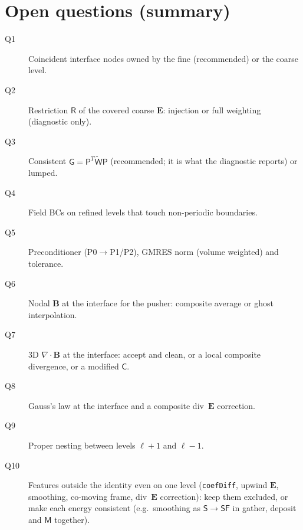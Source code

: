 \documentclass[a4paper,11pt]{article}
\newcommand{\code}[1]{\texttt{#1}}
\newcommand{\Sm}{\mathsf{S}}
\newcommand{\Pm}{\mathsf{P}}
\newcommand{\Rm}{\mathsf{R}}
\newcommand{\Cm}{\mathsf{C}}
\newcommand{\Gm}{\mathsf{G}}
\newcommand{\Mm}{\mathsf{M}}
\newcommand{\Wt}{\widetilde{\mathsf{W}}}
\begin{document}
\section{Open questions (summary)}\label{sec:open}
\begin{description}
\item[Q1] Coincident interface nodes owned by the fine (recommended) or the coarse level.
\item[Q2] Restriction $\Rm$ of the covered coarse $\mathbf{E}$: injection or full weighting (diagnostic only).
\item[Q3] Consistent $\Gm=\Pm^T\Wt\Pm$ (recommended; it is what the diagnostic reports) or lumped.
\item[Q4] Field BCs on refined levels that touch non-periodic boundaries.
\item[Q5] Preconditioner (P0$\to$P1/P2), GMRES norm (volume weighted) and tolerance.
\item[Q6] Nodal $\mathbf{B}$ at the interface for the pusher: composite average or ghost interpolation.
\item[Q7] 3D $\nabla\cdot\mathbf{B}$ at the interface: accept and clean, or a local
  composite divergence, or a modified $\Cm$.
\item[Q8] Gauss's law at the interface and a composite div~$\mathbf{E}$ correction.
\item[Q9] Proper nesting between levels $\ell+1$ and $\ell-1$.
\item[Q10] Features outside the identity even on one level (\code{coefDiff}, upwind
  $\mathbf{E}$, smoothing, co-moving frame, div~$\mathbf{E}$ correction): keep them excluded,
  or make each energy consistent (e.g.\ smoothing as $\Sm\to\Sm\mathsf F$ in gather,
  deposit and $\Mm$ together).
\end{description}
\end{document}
